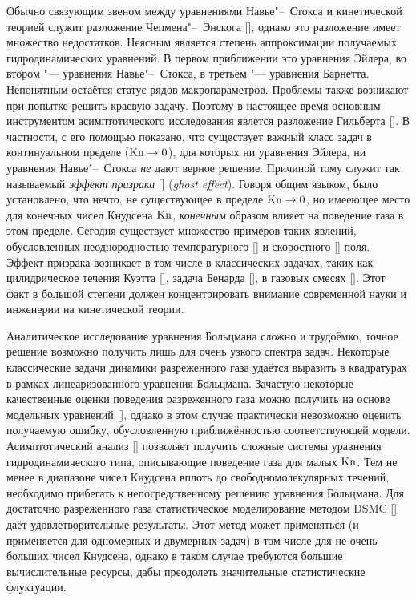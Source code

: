 Обычно связующим звеном между уравнениями Навье"--~Стокса и кинетической теорией служит разложение Чепмена"--~Энскога [],
однако это разложение имеет множество недостатков. Неясным является степень аппроксимации получаемых гидродинамических уравнений.
В первом приближении это уравнения Эйлера, во втором "--- уравнения Навье"--~Стокса, в третьем "--- уравнения Барнетта.
Непонятным остаётся статус рядов макропараметров. Проблемы также возникают при попытке решить краевую задачу.
Поэтому в настоящее время основным инструментом асимптотического исследования явлется разложение Гильберта [].
В частности, с его помощью показано, что существует важный класс задач в континуальном пределе (\(\mathrm{Kn}\to0\)),
для которых ни уравнения Эйлера, ни уравнения Навье"--~Стокса \textit{не} дают верное решение.
Причиной тому служит так называемый \textit{эффект призрака} [] (\textit{ghost effect}).
Говоря общим языком, было установлено, что нечто, не существующее в пределе \(\mathrm{Kn}\to0\),
но имееющее место для конечных чисел Кнудсена \(\mathrm{Kn}\), \textit{конечным} образом влияет на поведение газа в этом пределе.
Сегодня существует множество примеров таких явлений, обусловленных неоднородностью температурного [] и скоростного [] поля.
Эффект призрака возникает в том числе в классических задачах, таких как цилидрическое течения Куэтта [], задача Бенарда [], в газовых смесях [].
Этот факт в большой степени должен концентрировать внимание современной науки и инженерии на кинетической теории.

Аналитическое исследование уравнения Больцмана сложно и трудоёмко, точное решение возможно получить лишь для очень узкого спектра задач.
Некоторые классические задачи динамики разреженного газа удаётся выразить в квадратурах в рамках линеаризованного уравнения Больцмана.
Зачастую некоторые качественные оценки поведения разреженного газа можно получить на основе модельных уравнений [],
однако в этом случае практически невозможно оценить получаемую ошибку, обусловленную приближённостью соответствующей модели.
Асимптотический анализ [] позволяет получить сложные системы уравнения гидродинамического типа, описывающие поведение газа для малых \(\mathrm{Kn}\).
Тем не менее в диапазоне чисел Кнудсена вплоть до свободномолекулярных течений, необходимо прибегать к непосредственному решению уравнения Больцмана.
Для достаточно разреженного газа статистическое моделирование методом DSMC [] даёт удовлетворительные результаты.
Этот метод может применяться (и применяется для одномерных и двумерных задач) в том числе для не очень больших чисел Кнудсена,
однако в таком случае требуются большие вычислительные ресурсы, дабы преодолеть значительные статистические флуктуации.

